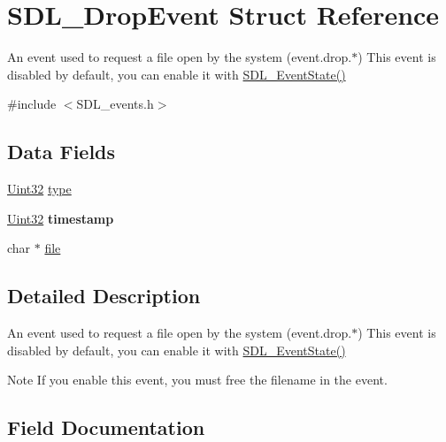 \hypertarget{struct_s_d_l___drop_event}{}\section{S\+D\+L\+\_\+\+Drop\+Event Struct Reference}
\label{struct_s_d_l___drop_event}


An event used to request a file open by the system (event.\+drop.$\ast$) This event is disabled by default, you can enable it with \hyperlink{_s_d_l__events_8h_afb772893e1c46f186fa39a4defe76df3}{S\+D\+L\+\_\+\+Event\+State()}  




{\ttfamily \#include $<$S\+D\+L\+\_\+events.\+h$>$}

\subsection*{Data Fields}
\begin{DoxyCompactItemize}
\item 
\hyperlink{_s_d_l__stdinc_8h_add440eff171ea5f55cb00c4a9ab8672d}{Uint32} \hyperlink{struct_s_d_l___drop_event_aa40a9b05c3154032b9f2d7220e9f08dc}{type}
\item 
\hyperlink{_s_d_l__stdinc_8h_add440eff171ea5f55cb00c4a9ab8672d}{Uint32} {\bfseries timestamp}\hypertarget{struct_s_d_l___drop_event_abf1ed7edeab81db9c05d899836a44a2f}{}\label{struct_s_d_l___drop_event_abf1ed7edeab81db9c05d899836a44a2f}

\item 
char $\ast$ \hyperlink{struct_s_d_l___drop_event_adf16cd437526a5c5e0e0af87745acbb8}{file}
\end{DoxyCompactItemize}


\subsection{Detailed Description}
An event used to request a file open by the system (event.\+drop.$\ast$) This event is disabled by default, you can enable it with \hyperlink{_s_d_l__events_8h_afb772893e1c46f186fa39a4defe76df3}{S\+D\+L\+\_\+\+Event\+State()} 

\begin{DoxyNote}{Note}
If you enable this event, you must free the filename in the event. 
\end{DoxyNote}


\subsection{Field Documentation}
